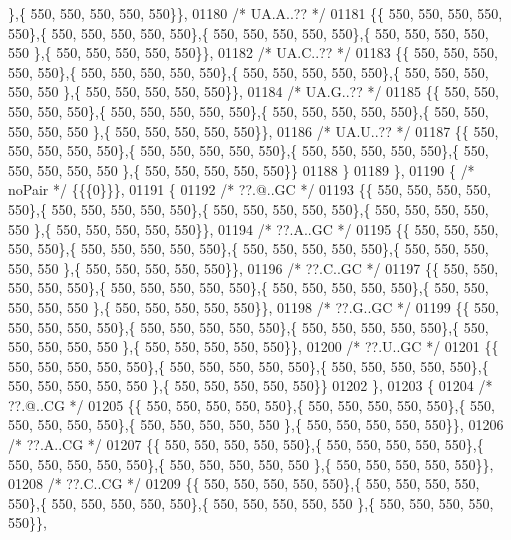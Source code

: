 \begin{DoxyCode}
      \},\{ 550, 550, 550, 550, 550\}\},
01180 \textcolor{comment}{/* UA.A..?? */}
01181 \{\{ 550, 550, 550, 550, 550\},\{ 550, 550, 550, 550, 550\},\{ 550, 550, 550, 550, 550\},\{ 550, 550, 550, 550, 550
      \},\{ 550, 550, 550, 550, 550\}\},
01182 \textcolor{comment}{/* UA.C..?? */}
01183 \{\{ 550, 550, 550, 550, 550\},\{ 550, 550, 550, 550, 550\},\{ 550, 550, 550, 550, 550\},\{ 550, 550, 550, 550, 550
      \},\{ 550, 550, 550, 550, 550\}\},
01184 \textcolor{comment}{/* UA.G..?? */}
01185 \{\{ 550, 550, 550, 550, 550\},\{ 550, 550, 550, 550, 550\},\{ 550, 550, 550, 550, 550\},\{ 550, 550, 550, 550, 550
      \},\{ 550, 550, 550, 550, 550\}\},
01186 \textcolor{comment}{/* UA.U..?? */}
01187 \{\{ 550, 550, 550, 550, 550\},\{ 550, 550, 550, 550, 550\},\{ 550, 550, 550, 550, 550\},\{ 550, 550, 550, 550, 550
      \},\{ 550, 550, 550, 550, 550\}\}
01188 \}
01189 \},
01190 \{ \textcolor{comment}{/* noPair */} \{\{\{0\}\}\},
01191 \{
01192 \textcolor{comment}{/* ??.@..GC */}
01193 \{\{ 550, 550, 550, 550, 550\},\{ 550, 550, 550, 550, 550\},\{ 550, 550, 550, 550, 550\},\{ 550, 550, 550, 550, 550
      \},\{ 550, 550, 550, 550, 550\}\},
01194 \textcolor{comment}{/* ??.A..GC */}
01195 \{\{ 550, 550, 550, 550, 550\},\{ 550, 550, 550, 550, 550\},\{ 550, 550, 550, 550, 550\},\{ 550, 550, 550, 550, 550
      \},\{ 550, 550, 550, 550, 550\}\},
01196 \textcolor{comment}{/* ??.C..GC */}
01197 \{\{ 550, 550, 550, 550, 550\},\{ 550, 550, 550, 550, 550\},\{ 550, 550, 550, 550, 550\},\{ 550, 550, 550, 550, 550
      \},\{ 550, 550, 550, 550, 550\}\},
01198 \textcolor{comment}{/* ??.G..GC */}
01199 \{\{ 550, 550, 550, 550, 550\},\{ 550, 550, 550, 550, 550\},\{ 550, 550, 550, 550, 550\},\{ 550, 550, 550, 550, 550
      \},\{ 550, 550, 550, 550, 550\}\},
01200 \textcolor{comment}{/* ??.U..GC */}
01201 \{\{ 550, 550, 550, 550, 550\},\{ 550, 550, 550, 550, 550\},\{ 550, 550, 550, 550, 550\},\{ 550, 550, 550, 550, 550
      \},\{ 550, 550, 550, 550, 550\}\}
01202 \},
01203 \{
01204 \textcolor{comment}{/* ??.@..CG */}
01205 \{\{ 550, 550, 550, 550, 550\},\{ 550, 550, 550, 550, 550\},\{ 550, 550, 550, 550, 550\},\{ 550, 550, 550, 550, 550
      \},\{ 550, 550, 550, 550, 550\}\},
01206 \textcolor{comment}{/* ??.A..CG */}
01207 \{\{ 550, 550, 550, 550, 550\},\{ 550, 550, 550, 550, 550\},\{ 550, 550, 550, 550, 550\},\{ 550, 550, 550, 550, 550
      \},\{ 550, 550, 550, 550, 550\}\},
01208 \textcolor{comment}{/* ??.C..CG */}
01209 \{\{ 550, 550, 550, 550, 550\},\{ 550, 550, 550, 550, 550\},\{ 550, 550, 550, 550, 550\},\{ 550, 550, 550, 550, 550
      \},\{ 550, 550, 550, 550, 550\}\},

\end{DoxyCode}

